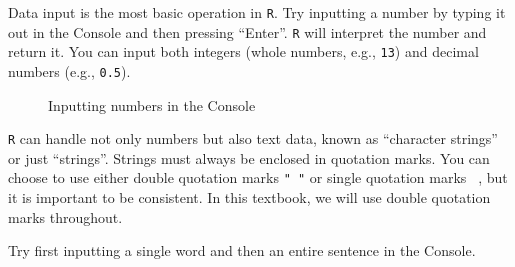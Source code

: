 \documentclass[
  letterpaper,
  DIV=11,
  numbers=noendperiod,
  oneside]{scrreprt}
\begin{document}
Data input is the most basic operation in \texttt{R}. Try inputting a
number by typing it out in the Console and then pressing ``Enter''.
\texttt{R} will interpret the number and return it. You can input both
integers (whole numbers, e.g., \texttt{13}) and decimal numbers (e.g.,
\texttt{0.5}).

\begin{figure}


\caption{\label{fig-ConsoleInputNumbers}Inputting numbers in the
Console}

\end{figure}%

\texttt{R} can handle not only numbers but also text data, known as
``character strings'' or just ``strings''. Strings must always be
enclosed in quotation marks. You can choose to use either double
quotation marks \texttt{"\ "} or single quotation marks
\texttt{\textquotesingle{}\ \textquotesingle{}}, but it is important to
be consistent. In this textbook, we will use double quotation marks
throughout.

Try first inputting a single word and then an entire sentence in the
Console.
\end{document}
